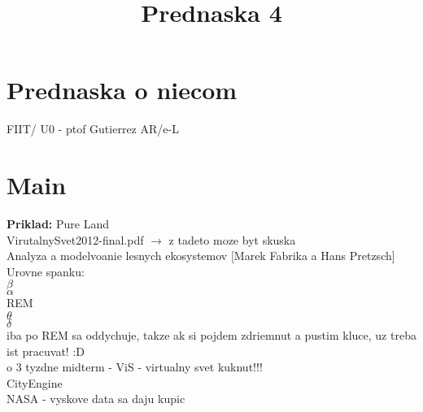 \documentclass[]{article}
\title{Prednaska 4}
\author{}
\begin{document}
\maketitle

\section{Prednaska o niecom}

FIIT/ U0 - ptof Gutierrez AR/e-L


\section{Main}
\begin{flushleft}
\textbf{Priklad:} Pure Land \\
VirutalnySvet2012-final.pdf $\rightarrow$ z tadeto moze byt skuska \\
Analyza a modelvoanie lesnych ekosystemov [Marek Fabrika a Hans Pretzsch] \\
Urovne spanku: \\
$\beta$ \\
$\alpha$ \\
REM \\
$\theta$ \\
$\delta$ \\

iba po REM sa oddychuje, takze ak si pojdem zdriemnut a pustim kluce, uz treba ist pracuvat! :D \\
 

o 3 tyzdne midterm - ViS - virtualny svet kuknut!!! \\

CityEngine \\

NASA - vyskove data sa daju kupic \\


\end{flushleft}
\end{document}
